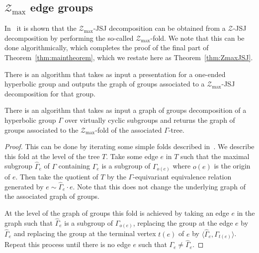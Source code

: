 \subsection{$\mathcal{Z}_\text{max}$ edge groups}

In~\cite{dahmaniguirardel11} it is shown that the $\mathcal{Z}_\text{max}$-JSJ
decomposition can be obtained from a $\mathcal{Z}$-JSJ decomposition by
performing the so-called $\mathcal{Z}_\text{max}$-fold. We note that this can
be done algorithmically, which completes the proof of the final part of
Theorem~\ref{thm:maintheorem}, which we restate here as Theorem~\ref{thm:ZmaxJSJ}.

\begin{thm}\label{thm:ZmaxJSJ} There is an algorithm that takes as input a presentation for a
one-ended hyperbolic group and outputs the graph of groups associated to a
$\mathcal{Z}_\text{max}$-JSJ decomposition for that group.\end{thm}

\begin{lem} There is an algorithm that takes as input a graph of groups
decomposition of a hyperbolic group $\Gamma$ over virtually cyclic subgroups
and returns the graph of groups associated to the
$\mathcal{Z}_\text{max}$-fold of the associated $\Gamma$-tree.\end{lem}

\begin{proof} This can be done by iterating some simple folds described
in~\cite{dahmaniguirardel11}. We describe this fold at the level of the tree
$T$. Take some edge $e$ in $T$ such that the maximal subgroup $\hat\Gamma_e$
of $\Gamma$ containing $\Gamma_e$ is a subgroup of $\Gamma_{o(e)}$ where $o(e)$ is
the origin of $e$. Then take the quotient of $T$ by the $\Gamma$-equivariant
equivalence relation generated by $e \sim \hat\Gamma_e \cdot e$. Note that this
does not change the underlying graph of the associated graph of groups.

At the level of the graph of groups this fold is achieved by taking an edge $e$
in the graph such that $\hat \Gamma_e$ is a subgroup of $\Gamma_{o(e)}$,
replacing the group at the edge $e$ by $\hat\Gamma_e$ and replacing the group
at the terminal vertex $t(e)$ of $e$ by $\langle\hat\Gamma_e,
\Gamma_{t(e)}\rangle$. Repeat this process until there is no edge $e$ such that
$\Gamma_e \neq \hat\Gamma_e$. \end{proof}


